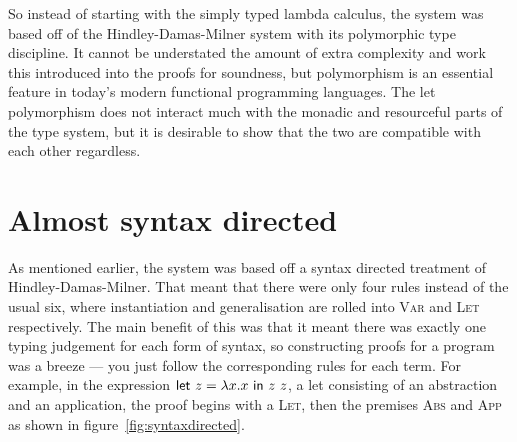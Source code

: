 So instead of starting with the simply typed lambda calculus, the
system was based off of the Hindley-Damas-Milner system with its
polymorphic type discipline. It cannot be understated the amount of
extra complexity and work this introduced into the proofs for
soundness, but polymorphism is an essential feature in today's
modern functional programming languages. The let polymorphism does not
interact much with the monadic and resourceful parts of the type
system, but it is desirable to show that the two are compatible with
each other regardless.

\section{Almost syntax directed}\label{sec:almost-synt-direct}
As mentioned earlier, the system was based off a syntax directed
treatment of Hindley-Damas-Milner. That meant that there were only
four rules instead of the usual six, where instantiation and
generalisation are rolled into \textsc{Var} and \textsc{Let}
respectively. The main benefit of this was that it meant there was
exactly one typing judgement for each form of syntax, so constructing
proofs for a program was a breeze --- you just follow the corresponding rules
for each term. For example, in the expression $\mathsf{let} \ z = \lambda x . x \ \mathsf{in} \ z \
  z$, a let consisting of an abstraction and an application, the proof begins with a
\textsc{Let}, then the premises \textsc{Abs} and \textsc{App} as shown
in figure~\ref{fig:syntaxdirected}.

